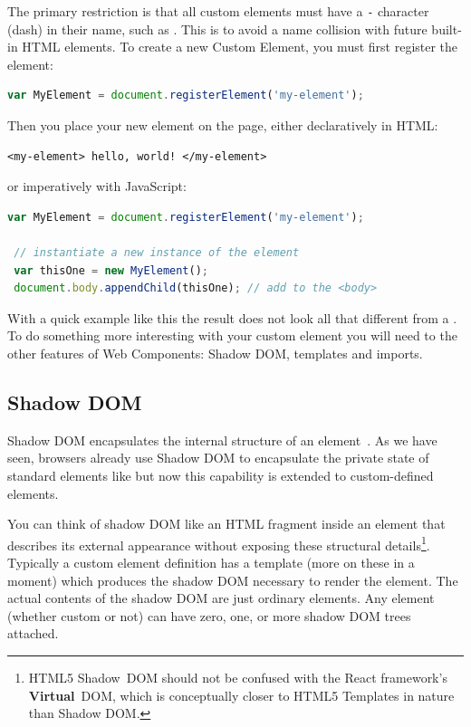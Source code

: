 The primary restriction is that all custom elements must have a \texttt{-} character (dash) in their name, such as . 
This is to avoid a name collision with future built-in HTML elements. 
To create a new Custom Element, you must first register the element:

\begin{lstlisting}[language=JavaScript,numbers=none]
 var MyElement = document.registerElement('my-element');
\end{lstlisting}

Then you place your new element on the page, either declaratively in HTML:

\begin{lstlisting}[language=HTML5,numbers=none]
 <my-element> hello, world! </my-element>
\end{lstlisting}

or imperatively with JavaScript:

\begin{lstlisting}[language=JavaScript]
 var MyElement = document.registerElement('my-element');

 // instantiate a new instance of the element
 var thisOne = new MyElement();      
 document.body.appendChild(thisOne); // add to the <body>
\end{lstlisting}

With a quick example like this the result does not look all that different from a .
To do something more interesting with your custom element you will need to the other features of Web Components: Shadow DOM, templates and imports.

\subsection{Shadow DOM}
\label{bg:shadowdom}
Shadow DOM encapsulates the internal structure of an element~\cite{w3ccontributors2015}. 
As we have seen, browsers already use Shadow DOM to encapsulate the private state of standard elements like  but now this capability is extended to custom-defined elements.

You can think of shadow DOM like an HTML fragment inside an element that describes its external appearance without exposing these structural details\footnote{
HTML5 Shadow~DOM should not be confused with the React framework's \textbf{Virtual}~DOM, which is conceptually closer to HTML5 Templates in nature than Shadow DOM.}. 
Typically a custom element definition has a template (more on these in a moment) which produces the shadow DOM necessary to render the element.
The actual contents of the shadow DOM are just ordinary elements.
Any element (whether custom or not) can have zero, one, or more shadow DOM trees attached.

